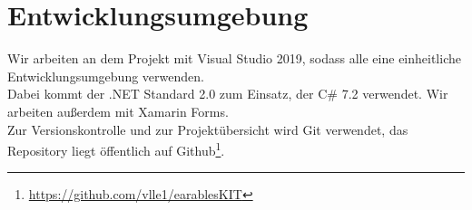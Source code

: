 \documentclass[a4paper,12pt]{article}
\begin{document}
\section{Entwicklungsumgebung}
Wir arbeiten an dem Projekt mit Visual Studio 2019, sodass alle eine einheitliche Entwicklungsumgebung verwenden.\\
Dabei kommt der .NET Standard 2.0 zum Einsatz, der C\# 7.2 verwendet. Wir arbeiten außerdem mit Xamarin Forms.\\
Zur Versionskontrolle und zur Projektübersicht wird Git verwendet, das Repository liegt öffentlich auf Github\footnote{\url{https://github.com/vlle1/earablesKIT}}.
\clearpage
\printglossaries
{}
\end{document}
